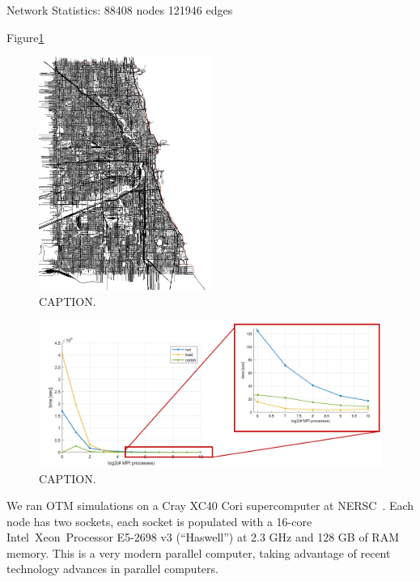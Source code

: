 Network Statistics:
    88408 nodes
	121946 edges



Figure\ref{fig:chicago}


\begin{figure}[h!]
    \centering
    \includegraphics[height=3in]{figs/Chicago_Net_Black_White.png}
    \caption{CAPTION.}
    \label{fig:chicago}
\end{figure}


\begin{figure}[h!]
    \centering
    \includegraphics[width=\columnwidth]{figs/mpirun.png}
    \caption{CAPTION.}
    \label{fig:mpirun}
\end{figure}


\vspace{1in}


We ran OTM simulations on a Cray XC40 Cori supercomputer at NERSC~\cite{Cori}. Each node has two sockets, each socket is
populated with a 16-core Intel\textcopyright~Xeon\texttrademark~Processor E5-2698 v3 (``Haswell'') at 2.3 GHz and 128 GB of RAM memory. This is a very modern parallel computer, taking advantage of recent technology advances in parallel computers. 








